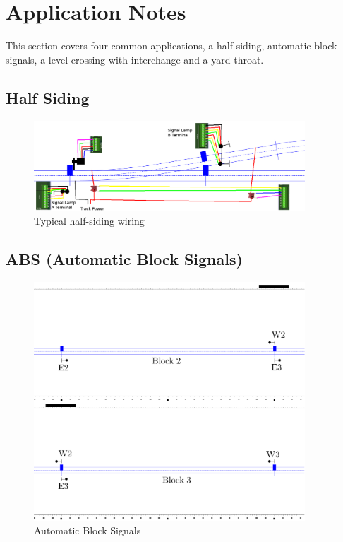 \clearpage
\section{Application Notes}

This section covers four common applications, a half-siding, automatic block 
signals, a level crossing with interchange and a yard throat.

\subsection{Half Siding}
\begin{figure}[hbpt]\begin{centering}%
\includegraphics[width=4in]{ESP32S3-ExampleSidingCP1Wiring.png}
\caption{Typical half-siding wiring}
\label{fig:ExampleSidingCP1Wiring}
\end{centering}\end{figure}


\subsection{ABS (Automatic Block Signals)}
\begin{figure}[hbpt]\begin{centering}%
\includegraphics[width=4in]{ESP32S3-ABSTrack_Stacked.png}
\caption{Automatic Block Signals}
\label{fig:ABSTrackStacked}
\end{centering}\end{figure}



